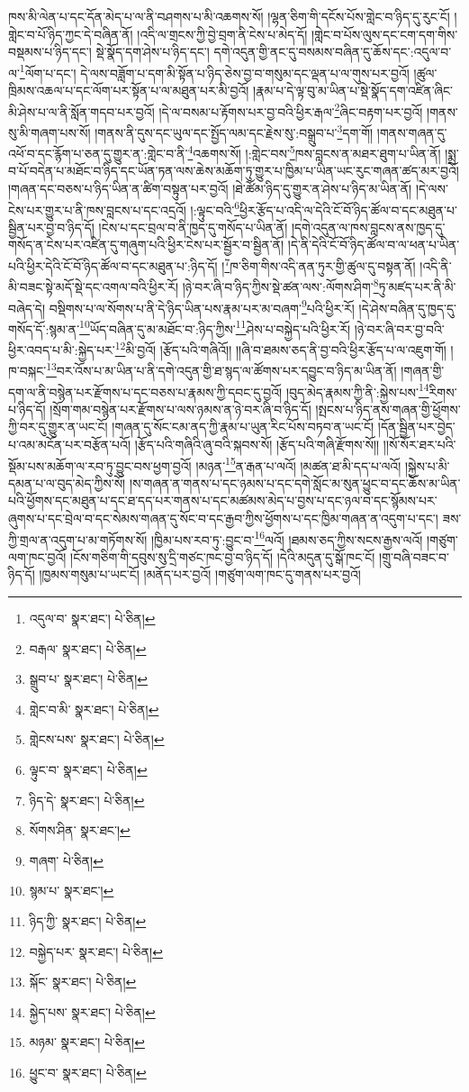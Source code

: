 ཁས་མི་ལེན་པ་དང་དོན་མེད་པ་ལ་ནི་བཤགས་པ་མི་འཆགས་སོ། །ལྷན་ཅིག་གི་དངོས་པོས་གླེང་བ་ཉིད་དུ་རུང་ངོ། །གླེང་བ་པོ་ཉིད་ཀྱང་དེ་བཞིན་ནོ། །འདི་ལ་གྲངས་ཀྱི་བྱེ་བྲག་ནི་ངེས་པ་མེད་དོ། །གླེང་བ་པོས་ལུས་དང་ངག་དག་གིས་བསྡམས་པ་ཉིད་དང་། སྡེ་སྣོད་དག་ཤེས་པ་ཉིད་དང་། དགེ་འདུན་གྱི་ནང་དུ་བསམས་བཞིན་དུ་ཆོས་དང་:འདུལ་བ་ལ་\footnote{འདུལ་བ་  སྣར་ཐང་།  པེ་ཅིན། }ལོག་པ་དང་། དེ་ལས་བཟློག་པ་དག་མི་སྟོན་པ་ཉིད་ཅེས་བྱ་བ་གསུམ་དང་ལྡན་པ་ལ་གུས་པར་བྱའོ། །ཚུལ་ཁྲིམས་འཆལ་པ་དང་ལོག་པར་སྟོན་པ་ལ་མཐུན་པར་མི་བྱའོ། །རྣམ་པ་དེ་ལྟ་བུ་མ་ཡིན་པ་སྡེ་སྣོད་དག་འཛིན་ཞིང་མི་ཤེས་པ་ལ་ནི་སློན་གདབ་པར་བྱའོ། །དེ་ལ་བསམ་པ་རྟོགས་པར་བྱ་བའི་ཕྱིར་རྒལ་\footnote{བརྒལ་  སྣར་ཐང་།  པེ་ཅིན། }ཞིང་བརྟག་པར་བྱའོ། །གནས་སུ་མི་གཞག་པས་སོ། །གནས་ནི་དུས་དང་ཡུལ་དང་སྤྱོད་ལམ་དང་རྗེས་སུ་:བསྒྲུབ་པ་\footnote{སྒྲུབ་པ་  སྣར་ཐང་།  པེ་ཅིན། }དག་གོ། །གནས་གཞན་དུ་འཕོ་བ་དང་རྙོག་པ་ཅན་དུ་གྱུར་ན་:གླེང་བ་ནི་\footnote{གླེང་བ་མི་  སྣར་ཐང་།  པེ་ཅིན། }འཆགས་སོ། །:གླེང་བས་\footnote{གླེངས་པས་  སྣར་ཐང་།  པེ་ཅིན། }ཁས་བླངས་ན་མཐར་ཐུག་པ་ཡིན་ནོ། །སྨྲ་བ་པོ་བདེན་པ་མཐོང་བ་ཉིད་དང་ཡོན་ཏན་ལས་ཆེས་མཆོག་ཏུ་གྱུར་པ་ཁྱིམ་པ་ཡིན་ཡང་རུང་གཞན་ཚད་མར་བྱའོ། །གཞན་དང་བཅས་པ་ཉིད་ཡིན་ན་ཚིག་བསྟུན་པར་བྱའོ། །ཐེ་ཚོམ་ཉིད་དུ་གྱུར་ན་ཤེས་པ་ཉིད་མ་ཡིན་ནོ། །དེ་ལས་ངེས་པར་གྱུར་པ་ནི་ཁས་བླངས་པ་དང་འདྲའོ། །:ལྟུང་བའི་\footnote{ལྟུང་བ་  སྣར་ཐང་།  པེ་ཅིན། }ཕྱིར་རྩོད་པ་འདི་ལ་དེའི་ངོ་བོ་ཉིད་ཚོལ་བ་དང་མཐུན་པ་སྦྱིན་པར་བྱ་བ་ཉིད་དོ། །ངེས་པ་དང་བྲལ་བ་ནི་ཁྱད་དུ་གསོད་པ་ཡིན་ནོ། །དགེ་འདུན་ལ་ཁས་བླངས་ནས་ཁྱད་དུ་གསོད་ན་ངེས་པར་འཛིན་དུ་གཞུག་པའི་ཕྱིར་ངེས་པར་སྦྱོར་བ་སྦྱིན་ནོ། །དེ་ནི་དེའི་ངོ་བོ་ཉིད་ཚོལ་བ་ལ་ཕན་པ་ཡིན་པའི་ཕྱིར་དེའི་ངོ་བོ་ཉིད་ཚོལ་བ་དང་མཐུན་པ་:ཉིད་དོ། །\footnote{ཉིད་དེ་  སྣར་ཐང་།  པེ་ཅིན། }ཁ་ཅིག་གིས་འདི་ནན་ཏུར་གྱི་ཚུལ་དུ་བསྟན་ནོ། །འདི་ནི་མི་བཟང་སྟེ་མདོ་སྡེ་དང་འགལ་བའི་ཕྱིར་རོ། །ཉེ་བར་ཞི་བ་ཉིད་ཀྱིས་སྡེ་ཚན་ལས་:ལོགས་ཤིག་\footnote{སོགས་ཤིན་  སྣར་ཐང་། }ཏུ་མཛད་པར་ནི་མི་བཞེད་དེ། བསྡིགས་པ་ལ་སོགས་པ་ནི་དེ་ཉིད་ཡིན་པས་རྣམ་པར་མ་བཞག་\footnote{གཞག་  པེ་ཅིན། }པའི་ཕྱིར་རོ། །དེ་ཤེས་བཞིན་དུ་ཁྱད་དུ་གསོད་དོ་:སྙམ་ན་\footnote{སྙམ་པ་  སྣར་ཐང་། }ཡོད་བཞིན་དུ་མ་མཐོང་བ་:ཉིད་ཀྱིས་\footnote{ཉིད་ཀྱི་  སྣར་ཐང་།  པེ་ཅིན། }ཤེས་པ་བསྐྱེད་པའི་ཕྱིར་རོ། །ཉེ་བར་ཞི་བར་བྱ་བའི་ཕྱིར་འབད་པ་མི་:སྐྱེད་པར་\footnote{བསྐྱེད་པར་  སྣར་ཐང་།  པེ་ཅིན། }མི་བྱའོ། །རྩོད་པའི་གཞིའོ།། །།ཞི་བ་ཐམས་ཅད་ནི་བྱ་བའི་ཕྱིར་རྩོད་པ་ལ་འཇུག་གོ། །ཁ་བསྐང་\footnote{སྐོང་  སྣར་ཐང་།  པེ་ཅིན། }བར་འོས་པ་མ་ཡིན་པ་ནི་དགེ་འདུན་གྱི་ཐ་སྙད་ལ་ཚོགས་པར་དབྱུང་བ་ཉིད་མ་ཡིན་ནོ། །གཞན་གྱི་དག་ལ་ནི་བསྙེན་པར་རྫོགས་པ་དང་བཅས་པ་རྣམས་ཀྱི་དབང་དུ་བྱའོ། །བུད་མེད་རྣམས་ཀྱི་ནི་:སྐྱེས་པས་\footnote{སྐྱེད་པས་  སྣར་ཐང་།  པེ་ཅིན། }རིགས་པ་ཉིད་དོ། །སྲོག་གམ་བསྙེན་པར་རྫོགས་པ་ལས་ཉམས་ན་ཉེ་བར་ཞི་བ་ཉིད་དོ། །སྤངས་པ་ཉིད་ནས་གཞན་གྱི་ཕྱོགས་ཀྱི་བར་དུ་གྱུར་ན་ཡང་ངོ། །གཞན་དུ་སོང་ངམ་ནད་ཀྱི་རྣམ་པ་ཡུན་རིང་པོས་བཏབ་ན་ཡང་ངོ། །དོན་སྦྱིན་པར་བྱེད་པ་འམ་མངོན་པར་བརྩོན་པའོ། །རྩོད་པའི་གཞིའི་ཞུ་བའི་སྐབས་སོ། །རྩོད་པའི་གཞི་རྫོགས་སོ།། །།སོ་སོར་ཐར་པའི་སྡོམ་པས་མཆོག་ལ་རབ་ཏུ་བྱུང་བས་ཕྱག་བྱའོ། །མཉན་\footnote{མཉམ་  སྣར་ཐང་།  པེ་ཅིན། }ན་རྒན་པ་ལའོ། །མཚན་ཐ་མི་དད་པ་ལའོ། །སྐྱེས་པ་མི་དམན་པ་ལ་བུད་མེད་ཀྱིས་སོ། །ས་གཞན་ན་གནས་པ་དང་ཉམས་པ་དང་དགེ་སློང་མ་སུན་ཕྱུང་བ་དང་ཆོས་མ་ཡིན་པའི་ཕྱོགས་དང་མཐུན་པ་དང་ཐ་དད་པར་གནས་པ་དང་མཚམས་མེད་པ་བྱས་པ་དང་ཉལ་བ་དང་སྙོམས་པར་ཞུགས་པ་དང་བྲེལ་བ་དང་སེམས་གཞན་དུ་སོང་བ་དང་རྒྱབ་ཀྱིས་ཕྱོགས་པ་དང་ཁྱིམ་གཞན་ན་འདུག་པ་དང་། ཟས་ཀྱི་གྲལ་ན་འདུག་པ་མ་གཏོགས་སོ། །ཁྱིམ་པས་རབ་ཏུ་:བྱུང་བ་\footnote{ཕྱུང་བ་  སྣར་ཐང་།  པེ་ཅིན། }ལའོ། །ཐམས་ཅད་ཀྱིས་སངས་རྒྱས་ལའོ། །གཙུག་ལག་ཁང་བྱའོ། །ངོས་གཅིག་གི་དབུས་སུ་དྲི་གཙང་ཁང་བྱ་བ་ཉིད་དོ། །དེའི་མདུན་དུ་སྒོ་ཁང་ངོ། །གྲུ་བཞི་བཟང་བ་ཉིད་དོ། །ཁྱམས་གསུམ་པ་ཡང་ངོ། །མནོད་པར་བྱའོ། །གཙུག་ལག་ཁང་དུ་གནས་པར་བྱའོ། 